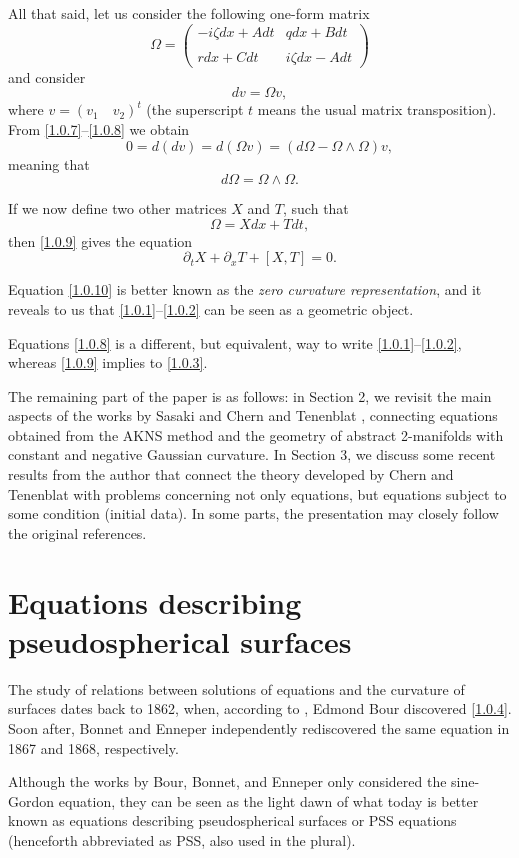 \documentclass{cimart}
\newcommand{\bb}{\begin{equation}}
\newcommand{\ee}{\end{equation}}
\begin{document}
All that said, let us consider the following one-form matrix
\bb\label{1.0.7}
\Omega=
\begin{pmatrix}
-i\zeta dx+Adt& qdx+Bdt\\
\\
rdx+Cdt& i\zeta dx-Adt
\end{pmatrix}
\ee
and consider
\bb\label{1.0.8}
dv=\Omega v,
\ee
where $v=(v_1\quad v_2)^t$ (the superscript $t$ means the usual matrix transposition). From \eqref{1.0.7}--\eqref{1.0.8} we obtain
$$
0=d(dv)=d(\Omega v)=(d\Omega-\Omega\wedge\Omega)v,
$$
meaning that
\bb\label{1.0.9}
d\Omega=\Omega\wedge\Omega.
\ee

If we now define two other matrices $X$ and $T$, such that
$$
\Omega=Xdx+Tdt,
$$
then \eqref{1.0.9} gives the equation
\bb\label{1.0.10}
\partial_tX+\partial_xT+[X,T]=0.
\ee

Equation \eqref{1.0.10} is better known as the {\it zero curvature representation}, and it reveals to us that \eqref{1.0.1}--\eqref{1.0.2} can be seen as a geometric object.

Equations \eqref{1.0.8} is a different, but equivalent, way to write \eqref{1.0.1}--\eqref{1.0.2}, whereas \eqref{1.0.9} implies to \eqref{1.0.3}.

The remaining part of the paper is as follows: in Section 2, we revisit the main aspects of the works by Sasaki \cite{sasaki} and Chern and Tenenblat \cite{chern}, connecting equations obtained from the AKNS method and the geometry of abstract 2-manifolds with constant and negative Gaussian curvature. In Section 3, we discuss some recent results from the author \cite{nilay,freire-tito-sam,freire-ch,freire-dp,nazime} that connect the theory developed by Chern and Tenenblat with problems concerning not only equations, but equations subject to some condition (initial data). In some parts, the presentation may closely follow the original references.

\section{Equations describing pseudospherical surfaces}

The study of relations between solutions of equations and the curvature of surfaces dates back to 1862, when, according to \cite[Introduction]{rogers}, Edmond Bour discovered \eqref{1.0.4}. Soon after, Bonnet and Enneper independently rediscovered the same equation in 1867 and 1868, respectively.

Although the works by Bour, Bonnet, and Enneper only considered the sine-Gordon equation, they can be seen as the light dawn of what today is better known as equations describing pseudospherical surfaces or PSS equations (henceforth abbreviated as PSS, also used in the plural).
\end{document}
